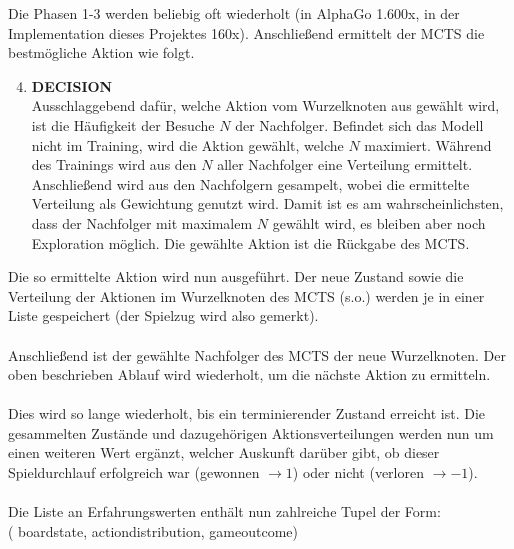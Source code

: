 	Die Phasen 1-3 werden beliebig oft wiederholt (in AlphaGo 1.600x, in der Implementation dieses Projektes 160x). Anschließend ermittelt der MCTS die bestmögliche Aktion wie folgt.
\begin{enumerate}\setcounter{enumi}{3}
	\item \textbf{DECISION}\\
	Ausschlaggebend dafür, welche Aktion vom Wurzelknoten aus gewählt wird, ist die Häufigkeit der Besuche $N$ der Nachfolger. 
	Befindet sich das Modell nicht im Training, wird die Aktion gewählt, welche $N$ maximiert.
	Während des Trainings wird aus den $N$ aller Nachfolger eine Verteilung ermittelt. Anschließend wird aus den Nachfolgern gesampelt, wobei die ermittelte Verteilung als Gewichtung genutzt wird. Damit ist es am wahrscheinlichsten, dass der Nachfolger mit maximalem $N$ gewählt wird, es bleiben aber noch Exploration möglich.
	Die gewählte Aktion ist die Rückgabe des MCTS.
\end{enumerate}
Die so ermittelte Aktion wird nun ausgeführt. Der neue Zustand sowie die Verteilung der Aktionen im Wurzelknoten des MCTS (s.o.) werden je in einer Liste gespeichert (der Spielzug wird also gemerkt).
\\\\
Anschließend ist der gewählte Nachfolger des MCTS der neue Wurzelknoten. Der oben beschrieben Ablauf wird wiederholt, um die nächste Aktion zu ermitteln.
\\\\
Dies wird so lange wiederholt, bis ein terminierender Zustand erreicht ist. Die gesammelten Zustände und dazugehörigen Aktionsverteilungen werden nun um einen weiteren Wert ergänzt, welcher Auskunft darüber gibt, ob dieser Spieldurchlauf erfolgreich war (gewonnen $\rightarrow 1$) oder nicht (verloren $\rightarrow -1$).
\\\\
Die Liste an Erfahrungswerten enthält nun zahlreiche Tupel der Form:\\
( board\textunderscore{}state, action\textunderscore{}distribution, game\textunderscore{}outcome)


